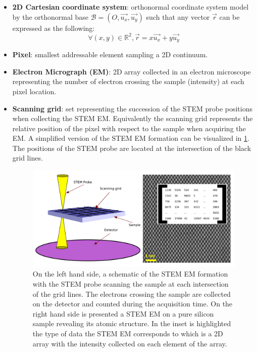 \documentclass[12pt]{article}
\begin{document}
\begin{itemize}

\item \textbf{2D Cartesian coordinate system}: orthonormal coordinate system model by the orthonormal base $\mathcal{B}=(O,\vec{u_x},\vec{u_y})$ such that any vector $\vec{r}$ can be expressed as the following:
\begin{equation}
\forall (x,y) \in \mathbb{R}^{2}, \vec{r}=x\vec{u_x}+y\vec{u_y}
\end{equation}
\item \textbf{Pixel}: smallest addressable element sampling a 2D continuum.
\item \textbf{Electron Micrograph (EM)}: 2D array collected in an electron microscope representing the number of electron crossing the sample (intensity) at each pixel location.
\item \textbf{Scanning grid}: set representing the succession of the STEM probe positions when collecting the STEM EM. Equivalently the scanning grid represents the relative position of the pixel with respect to the sample when acquiring the EM. A simplified version of the 
STEM EM formation can be visualized in \cref{fig:STEM_imaging_Fig}. The positions of the STEM probe are located at the intersection of the black grid lines.
\begin{figure}[H]
\includegraphics[width=\linewidth]{Figures/STEM_imaging_Fig.png}
\caption{On the left hand side, a schematic of the STEM EM formation with the STEM probe scanning the sample at each intersection of the grid lines. The electrons crossing the sample are collected on the detector and counted during the acquisition time. On the right hand side is presented a STEM EM on a pure silicon sample revealing its atomic structure. In the inset is highlighted the type of data the STEM EM corresponds to which is a 2D array with the intensity collected on each element of the array.}
\label{fig:STEM_imaging_Fig}

\end{figure}
\end{itemize}
\end{document}
